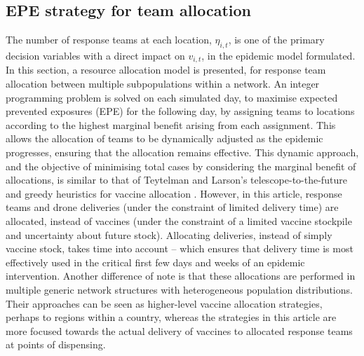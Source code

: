 \documentclass[10pt,letterpaper]{article}
\begin{document}
\subsection*{EPE strategy for team allocation}
The number of response teams at each location, $\eta_{i,t}$, is one of the primary decision variables with a direct impact on $v_{i,t}$, in the epidemic model formulated. In this section, a resource allocation model is presented, for response team allocation between multiple subpopulations within a network. An integer programming problem is solved on each simulated day, to maximise expected prevented exposures (EPE) for the following day, by assigning teams to locations according to the highest marginal benefit arising from each assignment. This allows the allocation of teams to be dynamically adjusted as the epidemic progresses, ensuring that the allocation remains effective. This dynamic approach, and the objective of minimising total cases by considering the marginal benefit of allocations, is similar to that of Teytelman and Larson's telescope-to-the-future and greedy heuristics for vaccine allocation \cite{teytelman2013multiregional}. However, in this article, response teams and drone deliveries (under the constraint of limited delivery time) are allocated, instead of vaccines (under the constraint of a limited vaccine stockpile and uncertainty about future stock). Allocating deliveries, instead of simply vaccine stock, takes time into account -- which ensures that delivery time is most effectively used in the critical first few days and weeks of an epidemic intervention. Another difference of note is that these allocations are performed in multiple generic network structures with heterogeneous population distributions. Their approaches can be seen as higher-level vaccine allocation strategies, perhaps to regions within a country, whereas the strategies in this article are more focused towards the actual delivery of vaccines to allocated response teams at points of dispensing.
\end{document}
